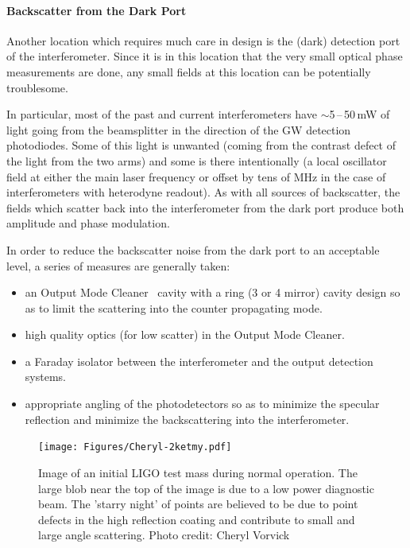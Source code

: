 \paragraph{Backscatter from the Dark Port}
Another location which requires much care in design is the (dark)
detection port of the interferometer. Since it is in this location
that the very small optical phase measurements are done, any small
fields at this location can be potentially troublesome.

In particular, most of the past and current interferometers have
$\sim$5\,--\,50\,mW of light going from the beamsplitter in the
direction of the GW detection photodiodes. Some of this light is
unwanted (coming from the contrast defect of the light from the two
arms) and some is there intentionally (a local oscillator field at
either the main laser frequency or offset by tens of MHz in the case
of interferometers with heterodyne readout). As with all sources of
backscatter, the fields which scatter back into the interferometer
from the dark port produce both amplitude and phase modulation.

In order to reduce the backscatter noise from the dark port to an
acceptable level, a series of measures are generally taken:
\begin{itemize}
\item an Output Mode Cleaner~\cite{Rob:2008,Tobin:DC} cavity 
  with a ring (3 or 4 mirror) cavity
  design so as to limit the scattering into the counter propagating mode.
\item high quality optics (for low scatter) in the Output Mode Cleaner.
\item a Faraday isolator between the interferometer and the output
  detection systems.
\item appropriate angling of the photodetectors so as to minimize the
  specular reflection and minimize the backscattering into the interferometer.
\end{itemize}



\begin{figure}[h]
  \centering
    \texttt{[image: Figures/Cheryl-2ketmy.pdf]}
    \caption[Point defects in a LIGO mirror]{Image of an initial LIGO 
      test mass during normal operation. The large blob near the top
      of the image is due to a low power diagnostic beam. The 
      'starry night' of points are believed to be due to point 
      defects in the high reflection coating and contribute to small 
      and large angle scattering. Photo credit: Cheryl Vorvick}
    \label{fig:2kETMy}
\end{figure}


